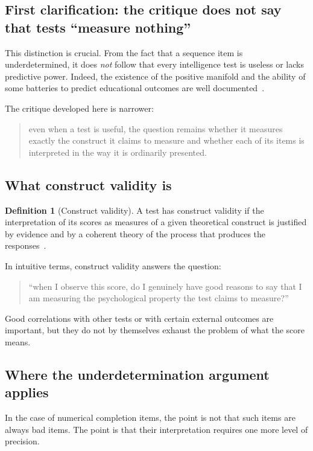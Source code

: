 \documentclass[10pt, a4paper]{article}
\theoremstyle{plain}
\theoremstyle{definition}
\newtheorem{definition}{Definition}
\theoremstyle{remark}
\begin{document}
\subsection{First clarification: the critique does not say that tests ``measure nothing''}

This distinction is crucial. From the fact that a sequence item is
underdetermined, it does \emph{not} follow that every intelligence test is
useless or lacks predictive power. Indeed, the existence of the positive
manifold and the ability of some batteries to predict educational outcomes are
well documented~\cite{deary2007, jensen1998}.

The critique developed here is narrower:
\begin{quote}
even when a test is useful, the question remains whether it measures exactly the
construct it claims to measure and whether each of its items is interpreted in
the way it is ordinarily presented.
\end{quote}

\subsection{What construct validity is}

\begin{definition}[Construct validity]
A test has construct validity if the interpretation of its scores as measures of
a given theoretical construct is justified by evidence and by a coherent theory
of the process that produces the responses~\cite{cronbach1955, borsboom2004}.
\end{definition}

In intuitive terms, construct validity answers the question:
\begin{quote}
``when I observe this score, do I genuinely have good reasons to say that I am
measuring the psychological property the test claims to measure?''
\end{quote}

Good correlations with other tests or with certain external outcomes are
important, but they do not by themselves exhaust the problem of what the score
means.

\subsection{Where the underdetermination argument applies}

In the case of numerical completion items, the point is not that such items are
always bad items. The point is that their interpretation requires one more level
of precision.
\end{document}
